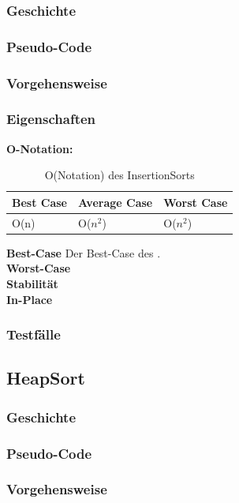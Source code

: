 \documentclass{article}
\begin{document}
\subsubsection{Geschichte}
\subsubsection{Pseudo-Code}
\subsubsection{Vorgehensweise}
\subsubsection{Eigenschaften}
\textbf{O-Notation:}
\begin{table}
\centering
\begin{tabular}{lll}
	\hline
	\textbf{Best Case} & \textbf{Average Case} & \textbf{Worst Case} \\
	\hline
	O(n) & O($n^{2}$) & O($n^{2}$) \\
	\hline
\end{tabular}
\caption{O(Notation) des InsertionSorts}
\label{tab:InsertioneSort}
\end{table}

\textbf{Best-Case} Der Best-Case des . \\
\textbf{Worst-Case} \\
\textbf{Stabilität}  \\

\textbf{In-Place}  \\
\subsubsection{Testfälle}

\subsection{HeapSort}
\subsubsection{Geschichte}
\subsubsection{Pseudo-Code}
\subsubsection{Vorgehensweise}
\end{document}
